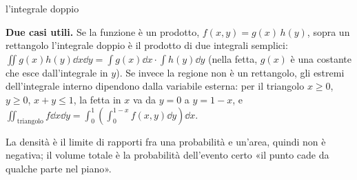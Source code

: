 \begin{richiamo}{l'integrale doppio}
\begin{center}
\end{center}
\textbf{Due casi utili.} Se la funzione è un prodotto, $f(x, y) = g(x)\, h(y)$, sopra un rettangolo l'integrale doppio è
il prodotto di due integrali semplici: $\iint g(x) h(y) \dd x \dd y = \int g(x) \dd x \cdot \int h(y) \dd y$ (nella fetta,
$g(x)$ è una costante che esce dall'integrale in $y$). Se invece la regione non è un rettangolo, gli estremi
dell'integrale interno dipendono dalla variabile esterna: per il triangolo $x \geq 0$, $y \geq 0$, $x + y \leq 1$, la
fetta in $x$ va da $y = 0$ a $y = 1 - x$, e
$\iint_{\text{triangolo}} f \dd x \dd y = \int_0^1 \left( \int_0^{1 - x} f(x, y) \dd y \right) \dd x$.
\end{richiamo}


\begin{dimostrazione}
\passo{} La densità è il limite di rapporti fra una probabilità e un'area, quindi non è negativa; il volume totale è la
probabilità dell'evento certo «il punto cade da qualche parte nel piano».
\end{dimostrazione}

